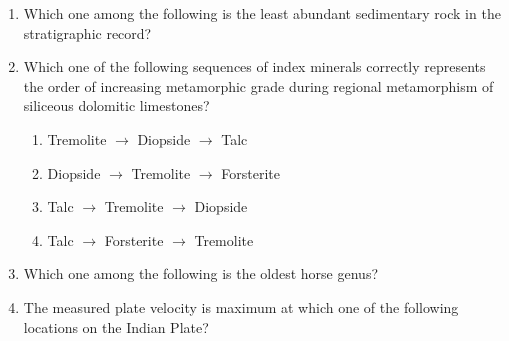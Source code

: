 \documentclass[journal,12pt,onecolumn]{IEEEtran}
\theoremstyle{remark}
\begin{document}
\begin{enumerate}
\item Which one among the following is the least abundant sedimentary rock in the stratigraphic record?
\begin{enumerate}
\end{enumerate}
\hfill{}

\item Which one of the following sequences of index minerals correctly represents the order of increasing metamorphic grade during regional metamorphism of siliceous dolomitic limestones?
\begin{enumerate}
    \item Tremolite $\rightarrow$ Diopside $\rightarrow$ Talc
    \item Diopside $\rightarrow$ Tremolite $\rightarrow$ Forsterite
    \item Talc $\rightarrow$ Tremolite $\rightarrow$ Diopside
    \item Talc $\rightarrow$ Forsterite $\rightarrow$ Tremolite
\end{enumerate}
\hfill{}

\item Which one among the following is the oldest horse genus?
\begin{enumerate}
\end{enumerate}
\hfill{}

\item The measured plate velocity is maximum  at which one of the following locations on the Indian Plate?
\begin{enumerate}
\end{enumerate}
\hfill{}


\end{enumerate}
\end{document}
